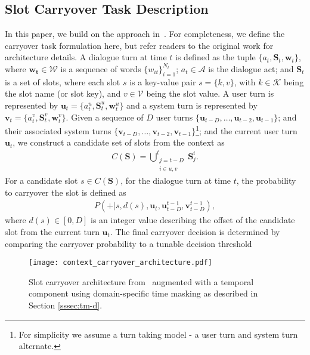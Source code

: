 \documentclass[11pt,a4paper]{article}
\begin{document}
\subsection{Slot Carryover Task Description}
\label{ssec:sc}
In this paper, we build on the approach in~\citep{cc-inter}. For completeness, we define the carryover task formulation here, but refer readers to the original work for architecture details.  A dialogue turn at time $t$ is defined as the tuple $\{a_t, \bm{S}_t, \bm{w}_t\}$, where $\bm{w_t} \in \mathcal{W}$ is  a sequence of words $\{w_{it}\}_{i=1}^{N_t}$;
$a_t \in \mathcal{A}$ is the dialogue act; and $\bm{S}_t$ is a set of slots, where each slot $s$ is a key-value pair $s=\{k,v\}$, with $k\in \mathcal{K}$ being the slot name (or slot key), 
and $v\in \mathcal{V}$ being the slot value. A user turn is represented by $\bm{u}_t=\{a_t^u, \bm{S}_t^u, \bm{w}_t^u\}$ and a system turn is represented by $\bm{v}_t=\{a_t^v, \bm{S}_t^v, \bm{w}_t^v\}$. Given a sequence of $D$ user turns $\{\bm{u}_{t-D}, \dots, \bm{u}_{t-2}, \bm{u}_{t-1}\}$;
and their associated system turns $\{\bm{v}_{t-D}, \dots, \bm{v}_{t-2}, \bm{v}_{t-1}\}$\footnote{For simplicity we assume a turn taking model - a user turn and system turn alternate.};
and the current user turn $\bm{u}_t$, we  construct a candidate set of slots from the context as 
\begin{eqnarray}
    C(\bm{S})=\bigcup\limits_{\substack{j=t-D \\ i \in {u,v}}}^{t} \bm{S}^i_j.
\end{eqnarray}
For a candidate slot $s \in C(\bm{S})$, for the dialogue turn at time $t$, the probability to carryover the slot is defined as
\begin{eqnarray}
P(+|s, d(s), \bm{u}_t, \bm{u}_{t-D}^{t-1}, \bm{v}_{t-D}^{t-1}),
\end{eqnarray}
where $d(s) \in [0, D]$ is an integer value describing the offset of the candidate slot from the current turn $\bm{u}_t$.
The final carryover decision is determined by comparing the carryover probability to a tunable decision threshold

\begin{figure*}[ht]
\begin{center}
\texttt{[image: context\_carryover\_architecture.pdf]}
\caption{Slot carryover architecture from~\cite{cc-inter} augmented with a temporal component using domain-specific time masking as described in Section \ref{sssec:tm-d}.
}
\label{fig:model-diagram}
\end{center}
\end{figure*}
\end{document}
